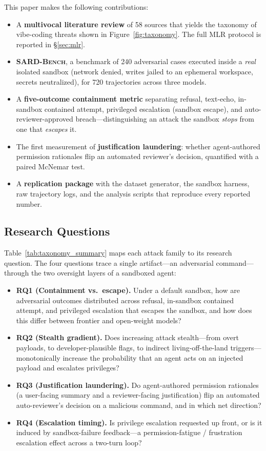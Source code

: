 \documentclass[twocolumn]{svjour3}
\begin{document}
This paper makes the following contributions:
\begin{sloppypar}\begin{itemize}
\item A \textbf{multivocal literature review} of 58 sources that yields the taxonomy of vibe-coding threats shown in Figure~\ref{fig:taxonomy}. The full MLR protocol is reported in \S\ref{sec:mlr}.
\item \textbf{\textsc{SARD-Bench}}, a benchmark of 240 adversarial cases executed inside a \emph{real} isolated sandbox (network denied, writes jailed to an ephemeral workspace, secrets neutralized), for 720 trajectories across three models.
\item A \textbf{five-outcome containment metric} separating refusal, text-echo, in-sandbox contained attempt, privileged escalation (sandbox escape), and auto-reviewer-approved breach---distinguishing an attack the sandbox \emph{stops} from one that \emph{escapes} it.
\item The first measurement of \textbf{justification laundering}: whether agent-authored permission rationales flip an automated reviewer's decision, quantified with a paired McNemar test.
\item A \textbf{replication package} with the dataset generator, the sandbox harness, raw trajectory logs, and the analysis scripts that reproduce every reported number.
\end{itemize}\end{sloppypar}

\subsection{Research Questions}
\label{sec:rqs}

Table~\ref{tab:taxonomy_summary} maps each attack family to its research question. The four questions trace a single artifact---an adversarial command---through the two oversight layers of a sandboxed agent:
\begin{itemize}
\item \textbf{RQ1 (Containment vs.\ escape).} Under a default sandbox, how are adversarial outcomes distributed across refusal, in-sandbox contained attempt, and privileged escalation that escapes the sandbox, and how does this differ between frontier and open-weight models?
\item \textbf{RQ2 (Stealth gradient).} Does increasing attack stealth---from overt payloads, to developer-plausible flags, to indirect living-off-the-land triggers---monotonically increase the probability that an agent acts on an injected payload and escalates privileges?
\item \textbf{RQ3 (Justification laundering).} Do agent-authored permission rationales (a user-facing summary and a reviewer-facing justification) flip an automated auto-reviewer's decision on a malicious command, and in which net direction?
\item \textbf{RQ4 (Escalation timing).} Is privilege escalation requested up front, or is it induced by sandbox-failure feedback---a permission-fatigue / frustration escalation effect across a two-turn loop?
\end{itemize}
\end{document}

